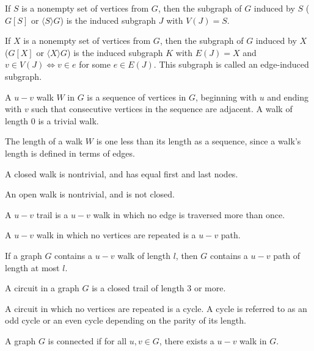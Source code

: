 \documentclass{article}
\begin{document}
    If $S$ is a nonempty set of vertices from $G$, then the subgraph of $G$ induced by $S$ ($G[S]$ or $\langle S \rangle G$) is the induced subgraph $J$ with $V(J) = S$.

    If $X$ is a nonempty set of vertices from $G$, then the subgraph of $G$ induced by $X$ ($G[X]$ or $\langle X \rangle G$) is the induced subgraph $K$ with $E(J) = X$ and $v \in V(J) \iff v \in e$ for some $e \in E(J)$. This subgraph is called an edge-induced subgraph.

\medskip
{}

    A $u-v$ walk $W$ in $G$ is a sequence of vertices in $G$, beginning with $u$ and ending with $v$ such that consecutive vertices in the sequence are adjacent. A walk of length 0 is a trivial walk.

    The length of a walk $W$ is one less than its length as a sequence, since a walk's length is defined in terms of edges.

\medskip
{}

    A closed walk is nontrivial, and has equal first and last nodes.

\medskip
{}

    An open walk is nontrivial, and is not closed.

\medskip
{}

    A $u-v$ trail is a $u-v$ walk in which no edge is traversed more than once.

\medskip
{}

    A $u-v$ walk in which no vertices are repeated is a $u-v$ path.

\medskip
{}

    If a graph $G$ contains a $u-v$ walk of length $l$, then $G$ contains a $u-v$ path of length at most $l$.

\medskip
{}

    A circuit in a graph $G$ is a closed trail of length 3 or more.

\medskip
{}

    A circuit in which no vertices are repeated is a cycle. A cycle is referred to as an odd cycle or an even cycle depending on the parity of its length.

\medskip
{}

    A graph $G$ is connected if for all $u,v \in G$, there exists a $u-v$ walk in $G$.
\end{document}
